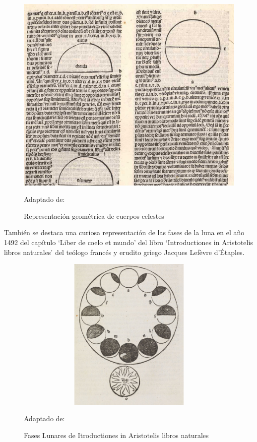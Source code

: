\begin{figure}[H]
    \includegraphics[scale = 0.55]{Imagenes/papiro.png}
    \centering
    \caption{Representación geométrica de cuerpos celestes}{ Adaptado de: \cite{decaelo}}
\end{figure}

También se destaca una curiosa representación de las fases de la luna en el año 1492 del capítulo `Liber de coelo et mundo' del libro `Introductiones in Aristotelis libros naturales' del teólogo francés y erudito griego Jacques Lefèvre d'Étaples.

\begin{figure}[H]
    \includegraphics[width = 12cm, height=7.5cm]{Imagenes/fasesLunares1492.png}
    \centering
    \caption{Fases Lunares de Itroductiones in Aristotelis libros naturales}{ Adaptado de: \cite{lunarspine}}
\end{figure}

